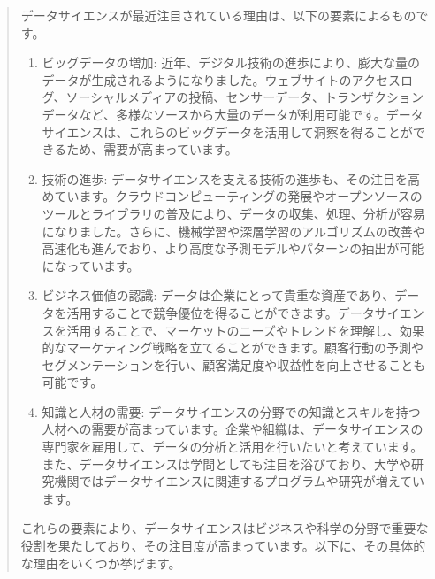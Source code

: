 \documentclass[
  xelatex, ja=standard]{bxjsbook}
\theoremstyle{definition}
\theoremstyle{definition}
\theoremstyle{definition}
\theoremstyle{definition}
\theoremstyle{remark}
\begin{document}
\begin{quote}
データサイエンスが最近注目されている理由は、以下の要素によるものです。

\begin{enumerate}
\def\labelenumi{\arabic{enumi}.}
\item
  ビッグデータの増加: 近年、デジタル技術の進歩により、膨大な量のデータが生成されるようになりました。ウェブサイトのアクセスログ、ソーシャルメディアの投稿、センサーデータ、トランザクションデータなど、多様なソースから大量のデータが利用可能です。データサイエンスは、これらのビッグデータを活用して洞察を得ることができるため、需要が高まっています。
\item
  技術の進歩: データサイエンスを支える技術の進歩も、その注目を高めています。クラウドコンピューティングの発展やオープンソースのツールとライブラリの普及により、データの収集、処理、分析が容易になりました。さらに、機械学習や深層学習のアルゴリズムの改善や高速化も進んでおり、より高度な予測モデルやパターンの抽出が可能になっています。
\item
  ビジネス価値の認識: データは企業にとって貴重な資産であり、データを活用することで競争優位を得ることができます。データサイエンスを活用することで、マーケットのニーズやトレンドを理解し、効果的なマーケティング戦略を立てることができます。顧客行動の予測やセグメンテーションを行い、顧客満足度や収益性を向上させることも可能です。
\item
  知識と人材の需要: データサイエンスの分野での知識とスキルを持つ人材への需要が高まっています。企業や組織は、データサイエンスの専門家を雇用して、データの分析と活用を行いたいと考えています。また、データサイエンスは学問としても注目を浴びており、大学や研究機関ではデータサイエンスに関連するプログラムや研究が増えています。
\end{enumerate}

これらの要素により、データサイエンスはビジネスや科学の分野で重要な役割を果たしており、その注目度が高まっています。以下に、その具体的な理由をいくつか挙げます。


\end{quote}
\end{document}
